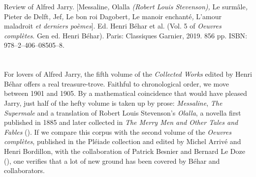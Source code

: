 


\begin{review}
\renewcommand*{\pagemark}{}


\begin{reviewed}
Review of Alfred Jarry. [Messaline\emph{,} Olalla \emph{(Robert Louis
Stevenson),} Le surmâle\emph{,} Pieter de Delft\emph{,} Jef\emph{,} Le
bon roi Dagobert\emph{,} Le manoir enchanté\emph{,} L'amour maladroit
\emph{et derniers poèmes}{]}. Ed. Henri Béhar et al. (Vol. 5 of
\emph{Oeuvres complètes}. Gen ed. Henri Béhar). Paris: Classiques
Garnier, 2019. 856 pp. ISBN: 978--2--406--08505--8.
\end{reviewed}


\section*{} 
For lovers of Alfred Jarry, the fifth volume of the \emph{Collected
Works} edited by Henri Béhar offers a real treasure-trove. Faithful to
chronological order, we move between 1901 and 1905. By a mathematical
coincidence that would have pleased Jarry, just half of the hefty volume
is taken up by prose: \emph{Messaline}, \emph{The Supermale} and a
translation of Robert Louis Stevenson's \emph{Olalla}, a novella first published in 1885 and later collected in \emph{The Merry Men and Other Tales and Fables} (\citeyear{stevenson_merry_1887}). If we compare
this corpus with the second volume of the \emph{Oeuvres complètes},
published in the Pléiade collection and edited by Michel Arrivé and Henri Bordillon, with the collaboration of Patrick Besnier and Bernard Le Doze (), one verifies that a lot of new ground has
been covered by Béhar and collaborators.


\end{review}

